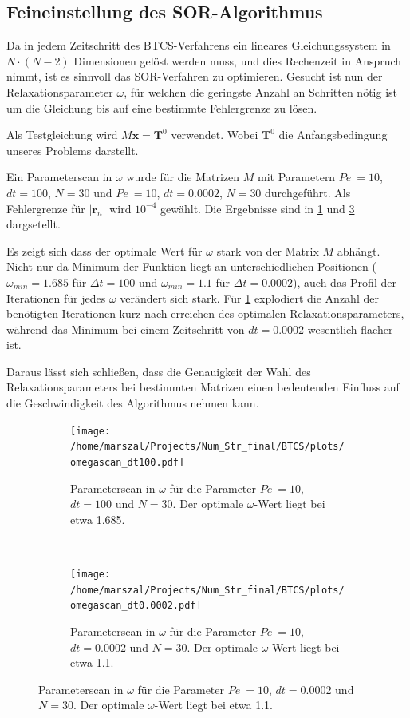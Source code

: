\subsection{Feineinstellung des SOR-Algorithmus}
Da in jedem Zeitschritt des BTCS-Verfahrens ein lineares Gleichungssystem in $N\cdot(N-2)$ Dimensionen gelöst werden muss, und dies Rechenzeit in Anspruch nimmt, ist es sinnvoll das SOR-Verfahren zu optimieren.
Gesucht ist nun der Relaxationsparameter $\omega$, für welchen die geringste Anzahl an Schritten nötig ist um die Gleichung bis auf eine bestimmte Fehlergrenze zu lösen.

Als Testgleichung wird $M\boldsymbol x = \boldsymbol T^0$ verwendet. Wobei $\boldsymbol T^0$ die Anfangsbedingung unseres Problems darstellt.

Ein Parameterscan in $\omega$ wurde für die Matrizen $M$ mit Parametern $Pe~=10$, $dt=100$, $N=30$ und $Pe~=10$, $dt=0.0002$, $N=30$ durchgeführt. Als Fehlergrenze für $|\boldsymbol r_n|$ wird $10^{-4}$ gewählt.
Die Ergebnisse sind in \cref{fig:parscan100} und \cref{fig:parscan000} dargsetellt.

Es zeigt sich dass der optimale Wert für $\omega$ stark von der Matrix $M$ abhängt.
Nicht nur da Minimum der Funktion liegt an unterschiedlichen Positionen ($\omega_{min}=1.685$ für $\Delta t=100$ und $\omega_{min}=1.1$ für $\Delta t=0.0002$), auch das Profil der Iterationen für jedes $\omega$ verändert sich stark. Für \cref{fig:parscan100} explodiert die Anzahl der benötigten Iterationen kurz nach erreichen des optimalen Relaxationsparameters, während das Minimum bei einem Zeitschritt von $dt=0.0002$ wesentlich flacher ist.

Daraus lässt sich schließen, dass die Genauigkeit der Wahl des Relaxationsparameters bei bestimmten Matrizen einen bedeutenden Einfluss auf die Geschwindigkeit des Algorithmus nehmen kann.

\begin{figure}
\centering
\begin{subfigure}[b]{0.45\textwidth}
  \texttt{[image: /home/marszal/Projects/Num\_Str\_final/BTCS/plots/omegascan\_dt100.pdf]}\caption{Parameterscan in $\omega$ für die Parameter $Pe~=10$, $dt=100$ und $N=30$. Der optimale $\omega$-Wert liegt bei etwa 1.685.}\label{fig:parscan100}
\end{subfigure}
~
\begin{subfigure}[b]{0.45\textwidth}
  \texttt{[image: /home/marszal/Projects/Num\_Str\_final/BTCS/plots/omegascan\_dt0.0002.pdf]}\caption{Parameterscan in $\omega$ für die Parameter $Pe~=10$, $dt=0.0002$ und $N=30$. Der optimale $\omega$-Wert liegt bei etwa 1.1.}\label{fig:parscan000}
\end{subfigure}
\end{figure}

